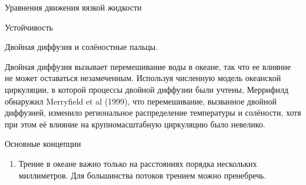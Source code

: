\begin{chapter}{Уравнения движения вязкой жидкости}
\begin{section}{Устойчивость}
\begin{paragraph}{Двойная диффузия и солёностные пальцы.}

Двойная диффузия вызывает перемешивание воды в океане, так что ее влияние не
может оставаться незамеченным. Используя численную модель океанской 
циркуляции, в которой процессы двойной диффузии были учтены, Меррифилд
обнаружил Merryfield et al (1999), что перемешивание, вызванное двойной 
диффузией, изменило региональное распределение температуры и солёности,
хотя при этом её влияние на крупномасштабную циркуляцию было невелико.
%
\end{paragraph}
\end{section}

\begin{section}{Основные концепции}
\begin{enumerate}
\item
Трение в океане важно только на расстояниях порядка нескольких миллиметров. 
Для большинства потоков трением можно пренебречь.
%


\end{enumerate}
\end{section}
\end{chapter}
